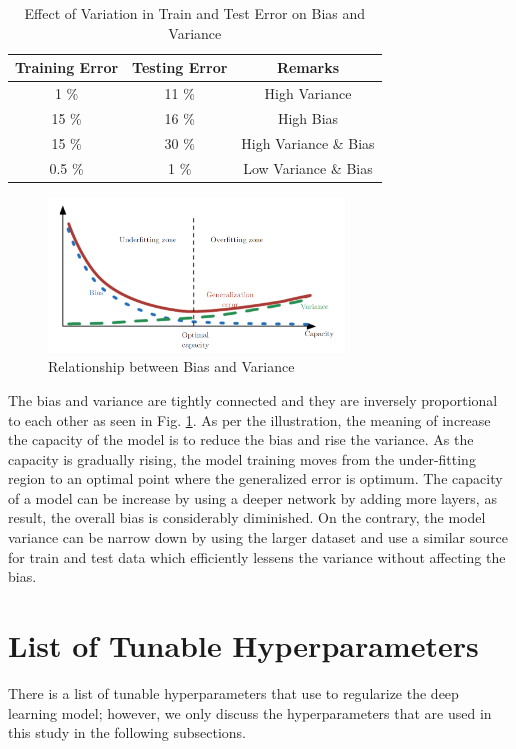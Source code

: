 \begin{table}
    \centering
    \begin{tabular}{|c|c|c|}
        \hline
        Training Error & Testing Error & Remarks \\
        \hline
        1 \% & 11 \% & High Variance \\
        \hline
        15 \% & 16 \% & High Bias \\
        \hline
        15 \% & 30 \% & High Variance \& Bias \\
        \hline
        0.5 \% & 1 \% & Low Variance \& Bias \\
        \hline        
    \end{tabular}
    \caption{Effect of Variation in Train and Test Error on Bias and Variance}
    \label{biasvariance}
\end{table}

\begin{figure}
    \centering
    \includegraphics[width=0.7\textwidth]{Images/relationship.png}
    \caption{Relationship between Bias and Variance \cite{goodfellow}}
    \label{relationship}
\end{figure}

The bias and variance are tightly connected and they are inversely proportional to each other as seen in Fig. \ref{relationship}. As per the illustration, the meaning of increase the capacity of the model is to reduce the bias and rise the variance. As the capacity is gradually rising, the model training moves from the under-fitting region to an optimal point where the generalized error is optimum. The capacity of a model can be increase by using a deeper network by adding more layers, as result, the overall bias is considerably diminished. On the contrary, the model variance can be narrow down by using the larger dataset and use a similar source for train and test data which efficiently lessens the variance without affecting the bias.      

\section{List of Tunable Hyperparameters}
There is a list of tunable hyperparameters that use to regularize the deep learning model; however, we only discuss the hyperparameters that are used in this study in the following subsections.  

